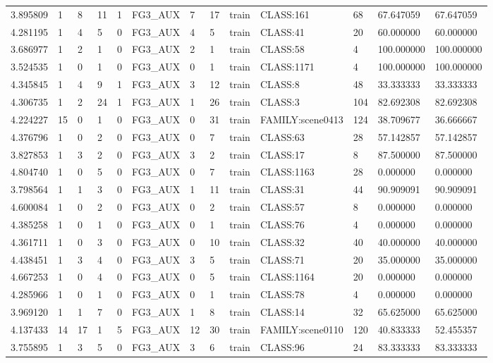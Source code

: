 \begin{tabular}{lllllllllllll}
3.895809 & 1 & 8 & 11 & 1 & FG3\_AUX & 7 & 17 & train & CLASS:161 & 68 & 67.647059 & 67.647059 \\
4.281195 & 1 & 4 & 5 & 0 & FG3\_AUX & 4 & 5 & train & CLASS:41 & 20 & 60.000000 & 60.000000 \\
3.686977 & 1 & 2 & 1 & 0 & FG3\_AUX & 2 & 1 & train & CLASS:58 & 4 & 100.000000 & 100.000000 \\
3.524535 & 1 & 0 & 1 & 0 & FG3\_AUX & 0 & 1 & train & CLASS:1171 & 4 & 100.000000 & 100.000000 \\
4.345845 & 1 & 4 & 9 & 1 & FG3\_AUX & 3 & 12 & train & CLASS:8 & 48 & 33.333333 & 33.333333 \\
4.306735 & 1 & 2 & 24 & 1 & FG3\_AUX & 1 & 26 & train & CLASS:3 & 104 & 82.692308 & 82.692308 \\
4.224227 & 15 & 0 & 1 & 0 & FG3\_AUX & 0 & 31 & train & FAMILY:scene0413 & 124 & 38.709677 & 36.666667 \\
4.376796 & 1 & 0 & 2 & 0 & FG3\_AUX & 0 & 7 & train & CLASS:63 & 28 & 57.142857 & 57.142857 \\
3.827853 & 1 & 3 & 2 & 0 & FG3\_AUX & 3 & 2 & train & CLASS:17 & 8 & 87.500000 & 87.500000 \\
4.804740 & 1 & 0 & 5 & 0 & FG3\_AUX & 0 & 7 & train & CLASS:1163 & 28 & 0.000000 & 0.000000 \\
3.798564 & 1 & 1 & 3 & 0 & FG3\_AUX & 1 & 11 & train & CLASS:31 & 44 & 90.909091 & 90.909091 \\
4.600084 & 1 & 0 & 2 & 0 & FG3\_AUX & 0 & 2 & train & CLASS:57 & 8 & 0.000000 & 0.000000 \\
4.385258 & 1 & 0 & 1 & 0 & FG3\_AUX & 0 & 1 & train & CLASS:76 & 4 & 0.000000 & 0.000000 \\
4.361711 & 1 & 0 & 3 & 0 & FG3\_AUX & 0 & 10 & train & CLASS:32 & 40 & 40.000000 & 40.000000 \\
4.438451 & 1 & 3 & 4 & 0 & FG3\_AUX & 3 & 5 & train & CLASS:71 & 20 & 35.000000 & 35.000000 \\
4.667253 & 1 & 0 & 4 & 0 & FG3\_AUX & 0 & 5 & train & CLASS:1164 & 20 & 0.000000 & 0.000000 \\
4.285966 & 1 & 0 & 1 & 0 & FG3\_AUX & 0 & 1 & train & CLASS:78 & 4 & 0.000000 & 0.000000 \\
3.969120 & 1 & 1 & 7 & 0 & FG3\_AUX & 1 & 8 & train & CLASS:14 & 32 & 65.625000 & 65.625000 \\
4.137433 & 14 & 17 & 1 & 5 & FG3\_AUX & 12 & 30 & train & FAMILY:scene0110 & 120 & 40.833333 & 52.455357 \\
3.755895 & 1 & 3 & 5 & 0 & FG3\_AUX & 3 & 6 & train & CLASS:96 & 24 & 83.333333 & 83.333333 \\

\end{tabular}
